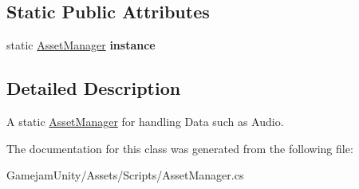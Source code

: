 \subsection*{Static Public Attributes}
\begin{DoxyCompactItemize}
\item 
\mbox{\label{class_dr_evil_1_1_data_structure_1_1_asset_manager_a17ad40765ce62d5b157668b11be83e76}} 
static \mbox{\hyperlink{class_dr_evil_1_1_data_structure_1_1_asset_manager}{Asset\+Manager}} {\bfseries instance}
\end{DoxyCompactItemize}


\subsection{Detailed Description}
A static \mbox{\hyperlink{class_dr_evil_1_1_data_structure_1_1_asset_manager}{Asset\+Manager}} for handling Data such as Audio. 



The documentation for this class was generated from the following file\+:\begin{DoxyCompactItemize}
\item 
Gamejam\+Unity/\+Assets/\+Scripts/Asset\+Manager.\+cs\end{DoxyCompactItemize}
